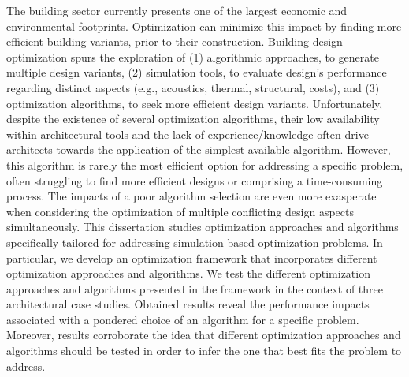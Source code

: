 \noindent 

The building sector currently presents one of the largest economic and environmental footprints. Optimization can minimize this impact by finding more efficient building variants, prior to their construction. Building design optimization spurs the exploration of (1) algorithmic approaches, to generate multiple design variants, (2) simulation tools, to evaluate design's performance regarding distinct aspects (e.g., acoustics, thermal, structural, costs), and (3) optimization algorithms, to seek more efficient design variants. Unfortunately, despite the existence of several optimization algorithms, their low availability within architectural tools and the lack of experience/knowledge often drive architects towards the application of the simplest available algorithm. However, this algorithm is rarely the most efficient option for addressing a specific problem, often struggling to find more efficient designs or comprising a time-consuming process. The impacts of a poor algorithm selection are even more exasperate when considering the optimization of multiple conflicting design aspects simultaneously. This dissertation studies optimization approaches and algorithms specifically tailored for addressing simulation-based optimization problems. In particular, we develop an optimization framework that incorporates different optimization approaches and algorithms. We test the different optimization approaches and algorithms presented in the framework in the context of three architectural case studies. Obtained results reveal the performance impacts associated with a pondered choice of an algorithm for a specific problem. Moreover, results corroborate the idea that different optimization approaches and algorithms should be tested in order to infer the one that best fits the problem to address. 
